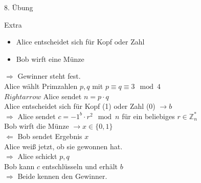 \begin{section}{8. Übung}
 \begin{subsection}{Extra}
  \begin{itemize}
   \item Alice entscheidet sich für Kopf oder Zahl
   \item Bob wirft eine Münze
  \end{itemize}
  $\Rightarrow$ Gewinner steht fest.\\
  Alice wählt Primzahlen $p,q$ mit $p\equiv q \equiv 3 \mod 4$\\
  $Rightarrow$ Alice sendet $n=p\cdot q$\\
  Alice entscheidet sich für Kopf (1) oder Zahl (0) $\rightarrow b$\\
  $\Rightarrow$ Alice sendet $c = -1^b \cdot r^2 \mod n $ für ein beliebiges $r\in \mathbb{Z}_n^*$\\
  Bob wirft die Münze $\rightarrow x \in \{0,1\}$\\
  $\Leftarrow$ Bob sendet Ergebnis $x$ \\
  Alice weiß jetzt, ob sie gewonnen hat.\\
  $\Rightarrow$ Alice schickt $p,q$\\
  Bob kann $c$ entschlüsseln und erhält $b$\\
  $\Rightarrow$ Beide kennen den Gewinner.

 \end{subsection}


\end{section}
